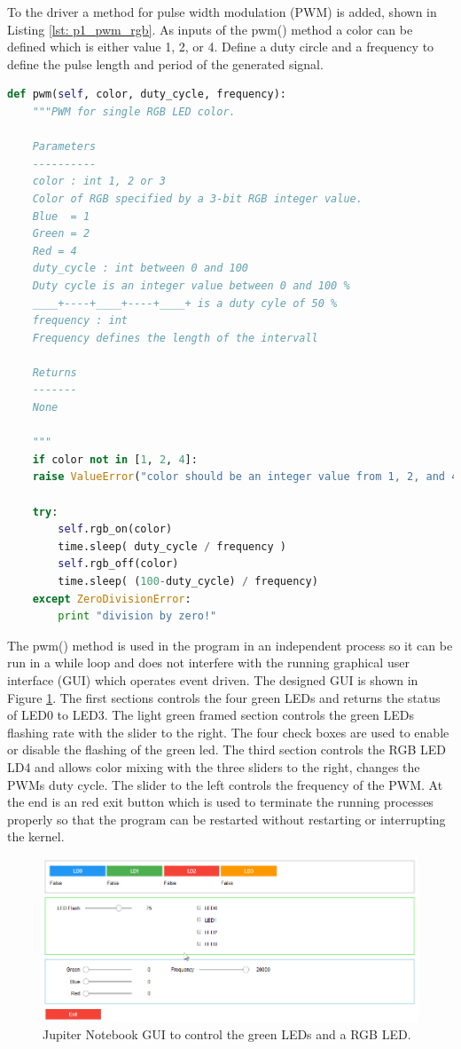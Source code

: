 To the driver a method for pulse width modulation (PWM) is added, shown in Listing \ref{lst: p1_pwm_rgb}. As inputs of the pwm() method a color can be defined which is either value 1, 2, or 4. Define a duty circle and a frequency to define the pulse length and period of the generated signal.
\begin{lstlisting}[style=PythonStyle, language=Python, caption={RGB LED driver PWM  method.},label=lst: p1_pwm_rgb]
def pwm(self, color, duty_cycle, frequency):    
    """PWM for single RGB LED color.
    
    Parameters
    ----------
    color : int 1, 2 or 3
    Color of RGB specified by a 3-bit RGB integer value.
    Blue  = 1
    Green = 2
    Red = 4
    duty_cycle : int between 0 and 100
    Duty cycle is an integer value between 0 and 100 %
    ____+----+____+----+____+ is a duty cyle of 50 %
    frequency : int
    Frequency defines the length of the intervall
    
    Returns
    -------
    None
    
    """        
    if color not in [1, 2, 4]:
    raise ValueError("color should be an integer value from 1, 2, and 4.")
    
    try:
        self.rgb_on(color)
        time.sleep( duty_cycle / frequency )
        self.rgb_off(color)
        time.sleep( (100-duty_cycle) / frequency)   
    except ZeroDivisionError:
        print "division by zero!"
\end{lstlisting}

The pwm() method is used in the program in an independent process so it can be run in a while loop and does not interfere with the running graphical user interface (GUI) which operates event driven. The designed GUI is shown in Figure \ref{fig: part1_gui}. The first sections controls the four green LEDs and returns the status of LED0 to LED3. The light green framed section controls the green LEDs flashing rate with the slider to the right. The four check boxes are used to enable or disable the flashing of the green led. The third section controls the RGB LED LD4 and allows color mixing with the three sliders to the right, changes the PWMs duty cycle. The slider to the left controls the frequency of the PWM. At the end is an red exit button which is used to terminate the running processes properly so that the program can be restarted without restarting or interrupting the kernel.
\begin{figure}[H]
	\centering
	\includegraphics[width=\textwidth]{01_images/p1_gui}
	\caption{Jupiter Notebook GUI to control the green LEDs and a RGB LED.}
	\label{fig: part1_gui}
\end{figure}

